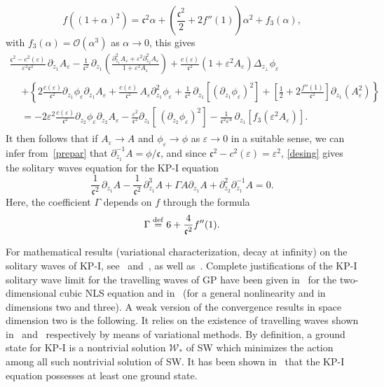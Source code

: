 \documentclass[10pt]{amsart}
\theoremstyle{definition}\newtheorem{defi}[theo]{Definition}\newtheorem{rema}[theo]{Remark}\newtheorem{exam}[theo]{Example}\newtheorem{exem}[theo]{Example}\newtheorem{nota}[theo]{Notation}
\newcommand*\p{\partial}
\newcommand*\ddef{\stackrel{\rm def}{=}}
\newcommand*\BO{\mathcal{O}}
\newcommand*\BW{\mathcal{W}}
\newcommand*\cs{{\mathfrak c}}
\newcommand*\e{\varepsilon}
\renewcommand*\a{\alpha}
\newcommand*\G{\Gamma}
\begin{document}
\begin{equation}\label{Taylor_NL}
f\left((1+ \a)^2 \right) = \cs^2 \a + \left(\frac{\cs^2}{2} + 2 f''(1) \right) \a^2 + f_3(\a),
\end{equation}
with $ f_3(\a) = \BO(\a^3) $ as $\a \to 0 $, this gives
\begin{multline}\label{desing}
\frac{\cs^2 - c^2(\e) }{\e^2 \cs^2} \, \p_{z_1} A_\e - \frac{1}{\cs^2} \, \p_{z_1} \left(
\frac{\p_{z_1}^2 A_\e + \e^2 \p^2_{z_2} A_\e}{1 + \e^2 A_\e} \right) + \frac{c(\e) }{\cs^2} \left(1 + \e^2 A_\e\right) \Delta_{z_\perp} \phi_\e
\\ 
\begin{aligned}
& +
\left\{ 2 \frac{c(\e)}{\cs^2} \p_{z_1} \phi_\e \p_{z_1} A_\e + \frac{c(\e)}{\cs^2}\, A_\e \p^2_{z_1} \phi_\e + \frac{1}{\cs^2} \, \p_{z_1} \left[(\p_{z_1} \phi_\e)^2\right] + \left[\frac{1}{2} + 2 \frac{f''(1)}{\cs^2} \right]
\p_{z_1} \left(A_\e^2\right) \right\} \\
& = - 2 \e^2 \frac{c(\e)}{\cs^2} \p_{z_2} \phi_\e \p_{z_2} A_\e - \frac{\e^2}{\cs^2} \p_{z_1} \left[\, (\p_{z_2} \phi_\e)^2\right] - \frac{1}{\cs^2 \e^4}\, \p_{z_1} \left[f_3\left(\e^2 A_\e\right)\right].
\end{aligned}
\end{multline}
It then follows that if $A_\e \to A$ and $\phi_\e \to \phi $ as $\e \to 0$ in a suitable sense, we can infer from~\eqref{prepar} that $\p_{z_1}^{-1} A = \phi/\cs$, and since $\cs^2 - c^2(\e) = \e^2$, \eqref{desing} gives the solitary waves equation for the KP-I equation
\begin{equation}
\tag{SW}
\frac{1}{\cs^2}\, \p_{z_1} A - \frac{1}{\cs^2} \, \p^3_{z_1} A + \G A \p_{z_1} A + \p_{z_2}^2 \p_{z_1}^{-1} A = 0.
\end{equation} Here, the coefficient $\G$ depends on $f$ through the formula
\[
\G \ddef 6 + \frac{4}{\cs^2} f''(1).
\]

For mathematical results (variational characterization, decay at infinity) on the solitary waves of KP-I, see~\cite{dBSIHP} and~\cite{dBS}, as well as~\cite{WangWillem96}. Complete justifications of the KP-I solitary wave limit for the travelling waves of GP have been given in~\cite{BGStranso2d} for the two-dimensional cubic NLS equation and in~\cite{CMraref} (for a general nonlinearity and in dimensions two and three). A weak version of the convergence results in space dimension two is the following. It relies on the existence of travelling waves shown in~\cite{BGS2} and~\cite{CM1} respectively by means of variational methods. By definition, a ground state for KP-I is a nontrivial solution $ \BW_* $ of SW which minimizes the action among all such nontrivial solution of SW. It has been shown in~\cite[Lemma~2.1]{dBS} that the KP-I equation possesses at least one ground state.
\end{document}
